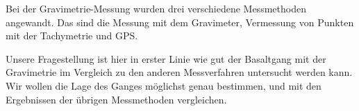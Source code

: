 Bei der Gravimetrie-Messung wurden drei verschiedene Messmethoden angewandt. Das sind die Messung mit dem Gravimeter, Vermessung von Punkten mit der Tachymetrie und GPS.

Unsere Fragestellung ist hier in erster Linie wie gut der Basaltgang mit der Gravimetrie im Vergleich zu den anderen Messverfahren untersucht werden kann.  Wir wollen die Lage des Ganges möglichst genau bestimmen, und mit den  Ergebnissen der übrigen Messmethoden vergleichen.
